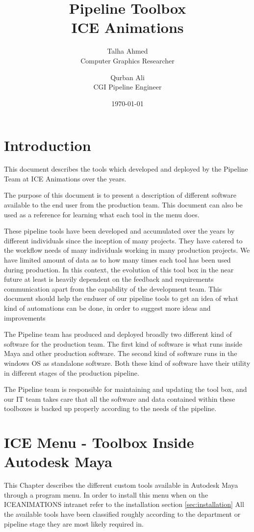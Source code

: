 \documentclass[10pt,a4paper,openany,oneside,onecolumn,titlepage]{report}
\author{
        Talha Ahmed \\ Computer Graphics Researcher \and 
        Qurban Ali \\ CGI Pipeline Engineer
}
\title{ Pipeline Toolbox \\ ICE Animations }
\date{\today}
\begin{document}
\maketitle
\tableofcontents \newpage
\chapter{Introduction}
This document describes the tools which developed and deployed by the Pipeline
Team at ICE Animations over the years.

The purpose of this document is to present a description of different software
available to the end user from the production team. This document can also be
used as a reference for learning what each tool in the menu does.

These pipeline tools have been developed and accumulated over the years by
different individuals since the inception of many projects. They have catered
to the workflow needs of many individuals working in many production projects.
We have limited amount of data as to how many times each tool has been used
during production. In this context, the evolution of this tool box in the near
future at least is heavily dependent on the feedback and requirements
communication apart from the capability of the development team. This document
should help the enduser of our pipeline tools to get an idea of what kind of
automations can be done, in order to suggest more ideas and improvements

The Pipeline team has produced and deployed broadly two different kind of
software for the production team. The first kind of software is what runs
inside Maya and other production software. The second kind of software runs in
the windows OS as standalone software. Both these kind of software have their
utility in different stages of the production pipeline.

The Pipeline team is responsible for maintaining and updating the tool box,
and our IT team takes care that all the software and data contained
within these toolboxes is backed up properly according to the needs of the
pipeline.



\chapter{ICE Menu - Toolbox Inside Autodesk Maya}
This Chapter describes the different custom tools available in Autodesk Maya
through a program menu. In order to install this menu when on the
ICEANIMATIONS intranet refer to the installation section
\ref{sec:installation}
All the available tools have been classified roughly according to the
department or pipeline stage they are most likely required in.
\end{document}

